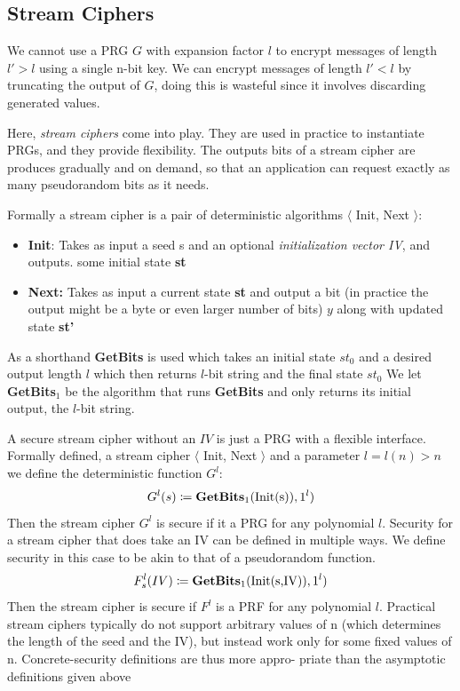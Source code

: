 \documentclass[12pt]{article}
\begin{document}
\subsection{Stream Ciphers}
We cannot use a PRG $G$ with expansion factor $l$ to encrypt messages of length $l' > l$ using a single n-bit key. We can encrypt messages of length $l' < l $ by truncating the output of $G$, doing this is wasteful since it involves discarding generated values.

Here, \emph{stream ciphers} come into play. They are used in practice to instantiate PRGs, and they provide flexibility. The outputs bits of a stream cipher are produces gradually and on demand, so that an application can request exactly as many pseudorandom bits as it needs.

Formally a stream cipher is a pair of deterministic algorithms $\langle$ Init, Next $\rangle$:
\begin{itemize}
\item \textbf{Init}: Takes as input a seed s and an optional \emph{initialization vector IV}, and outputs. some initial state \textbf{st}
\item \textbf{Next:} Takes as input a current state \textbf{st} and output a bit (in practice the output might be a byte or even larger number of bits) $y$ along with updated state  \textbf{st'}
\end{itemize}

As a shorthand \textbf{GetBits} is used which takes an initial state $st_0$ and a desired output length $l$ which then returns $l$-bit string and the final state $st_0$
We let \textbf{GetBits}$_1$ be the algorithm that runs \textbf{GetBits} and only returns its initial output, the $l$-bit string.


A secure stream cipher without an $IV$ is just a PRG with a flexible interface.
Formally defined, a stream cipher $\langle$ Init, Next $\rangle$ and a parameter $l = l(n) > n $ we define the deterministic function $G^l$:
\begin{equation*}
G^l(s) \coloneqq \textbf{GetBits}_1(\text{Init(s)}),1^l)
\end{equation*}
Then the stream cipher $G^l$ is secure if it a PRG for any polynomial $l$.
Security for a stream cipher that does take an IV can be defined in multiple
ways. We define security in this case to be akin to that of a pseudorandom
function.
\begin{equation*}
F_s^l(IV) \coloneqq \textbf{GetBits}_1(\text{Init(s,IV)}),1^l)
\end{equation*}
Then the stream cipher is secure if $F^l$ is a PRF for any polynomial $l$. Practical stream ciphers typically do not support arbitrary values of n
(which determines the length of the seed and the IV), but instead work only
for some fixed values of n. Concrete-security definitions are thus more appro-
priate than the asymptotic definitions given above
\end{document}

